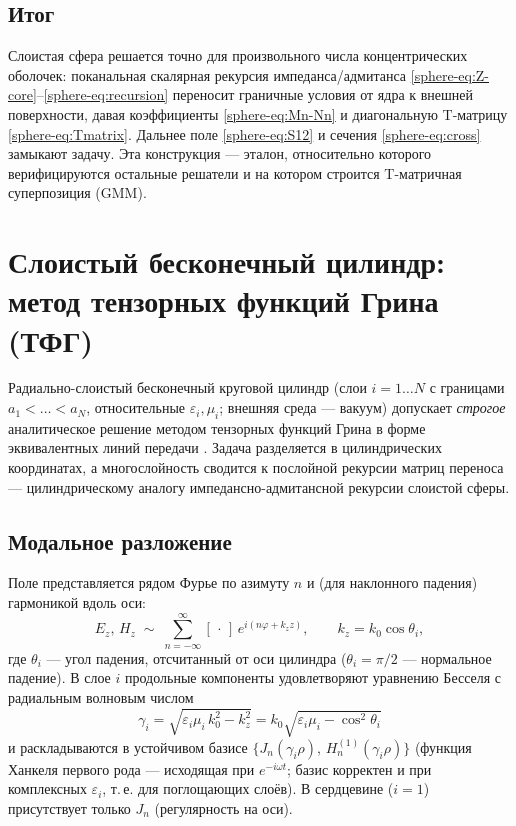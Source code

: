 \documentclass[11pt,a4paper]{article}
\begin{document}
\subsection{Итог}

Слоистая сфера решается точно для произвольного числа концентрических оболочек: поканальная скалярная рекурсия импеданса/адмитанса \eqref{sphere-eq:Z-core}--\eqref{sphere-eq:recursion} переносит граничные условия от ядра к внешней поверхности, давая коэффициенты \eqref{sphere-eq:Mn-Nn} и диагональную T-матрицу \eqref{sphere-eq:Tmatrix}. Дальнее поле \eqref{sphere-eq:S12} и сечения \eqref{sphere-eq:cross} замыкают задачу. Эта конструкция --- эталон, относительно которого верифицируются остальные решатели и на котором строится T-матричная суперпозиция (GMM).

\section{Слоистый бесконечный цилиндр: метод тензорных функций Грина (ТФГ)}
\label{laycyl-sec:layered-cylinder}

Радиально-слоистый бесконечный круговой цилиндр (слои $i=1\ldots N$ с границами $a_1<\dots<a_N$, относительные $\varepsilon_i,\mu_i$; внешняя среда --- вакуум) допускает \emph{строгое} аналитическое решение методом тензорных функций Грина в форме эквивалентных линий передачи \cite{daylis2017,mitelman2013}. Задача разделяется в цилиндрических координатах, а многослойность сводится к послойной рекурсии матриц переноса --- цилиндрическому аналогу импедансно-адмитансной рекурсии слоистой сферы.

\subsection{Модальное разложение}
\label{laycyl-ssec:modal}
Поле представляется рядом Фурье по азимуту $n$ и (для наклонного падения) гармоникой вдоль оси:
\begin{equation}
E_z,\,H_z \;\sim\; \sum_{n=-\infty}^{\infty} [\,\cdot\,]\,e^{i(n\varphi + k_z z)},\qquad k_z=k_0\cos\theta_i,
\label{laycyl-eq:expansion}
\end{equation}
где $\theta_i$ --- угол падения, отсчитанный от оси цилиндра ($\theta_i=\pi/2$ --- нормальное падение). В слое $i$ продольные компоненты удовлетворяют уравнению Бесселя с радиальным волновым числом
\begin{equation}
\gamma_i=\sqrt{\varepsilon_i\mu_i\,k_0^2-k_z^2}=k_0\sqrt{\varepsilon_i\mu_i-\cos^2\theta_i}
\label{laycyl-eq:gamma}
\end{equation}
и раскладываются в устойчивом базисе $\{J_n(\gamma_i\rho),\,H_n^{(1)}(\gamma_i\rho)\}$ (функция Ханкеля первого рода --- исходящая при $e^{-i\omega t}$; базис корректен и при комплексных $\varepsilon_i$, т.\,е. для поглощающих слоёв). В сердцевине ($i=1$) присутствует только $J_n$ (регулярность на оси).
\end{document}
